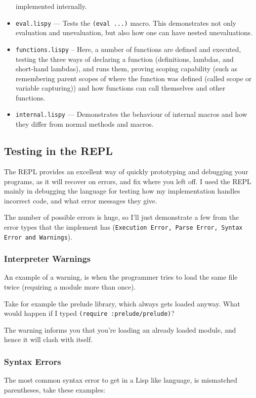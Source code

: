 \documentclass{article}
\newcommand{\code}[1]{\texttt{#1}}
\begin{document}
\begin{itemize}
      implemented internally.
      \item \code{eval.lispy} --- Tests the \code{(eval ...)} macro. This demonstrates
      not only evaluation and unevaluation, but also how one can have nested unevaluations.
      \item \code{functions.lispy} -- Here, a number of functions are defined
      and executed, testing the three ways of declaring a function (definitions,
      lambdas, and short-hand lambdas), and runs them, proving scoping capability
      (such as remembering parent scopes of where the function was defined (called
      scope or variable capturing)) and how functions can call themselves and other functions.
      \item \code{internal.lispy} --- Demonstrates the behaviour of internal
      macros and how they differ from normal methods and macros.
    \end{itemize}
  \subsection{Testing in the REPL}
    The REPL provides an excellent way of quickly prototyping and debugging your
    programs, as it will recover on errors, and fix where you left off.
    I used the REPL mainly in debugging the language for testing how my
    implementation handles incorrect code, and what error messages they give.

    The number of possible errors is huge, so I'll just demonstrate a few from the
    error types that the implement has (\code{Execution Error, Parse Error, Syntax Error
    and Warnings}).

    \subsubsection{Interpreter Warnings}
      An example of a warning, is when the programmer tries to load
      the same file twice (requiring a module more than once).

      Take for example the prelude library, which always gets loaded anyway.
      What would happen if I typed \code{(require :prelude/prelude)}?


      The warning informs you that you're loading an already loaded module, and
      hence it will clash with itself.

    \subsubsection{Syntax Errors}
      The most common syntax error to get in a Lisp like language, is
      mismatched parentheses, take these examples:
\end{document}
